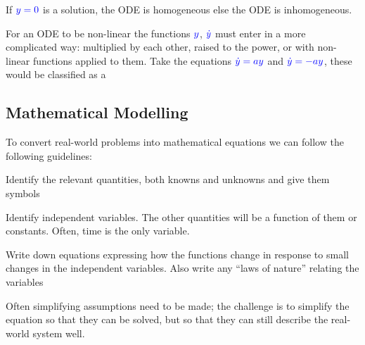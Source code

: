 \documentclass[11pt, openright]{book}
\begin{document}
\note If $\color{blue} y=0$ is a solution, the ODE is homogeneous else the ODE is inhomogeneous.

For an ODE to be non-linear the functions $\color{blue} y$, $\color{blue} \dot{y}$ must enter in a more complicated way: multiplied by each other, raised to the power, or with non-linear functions applied to them.
Take the equations $\color{blue} \dot{y}=ay$ and $\color{blue} \dot{y}=-ay$, these would be classified as a 

\newpage

\subsection{Mathematical Modelling}


To convert real-world problems into mathematical equations we can follow the following guidelines:
\begin{items}{-10pt}{-10pt}
    \item Identify the relevant quantities, both knowns and unknowns and give them symbols
    \item Identify independent variables. The other quantities will be a function of them or constants. Often, time is the only variable.
    \item Write down equations expressing how the functions change in response to small changes in the independent variables. Also write any ``laws of nature'' relating the variables
\end{items}

Often simplifying assumptions need to be made; the challenge is to simplify the equation so that they can be solved, but so that they can still describe the real-world system well.
\end{document}
